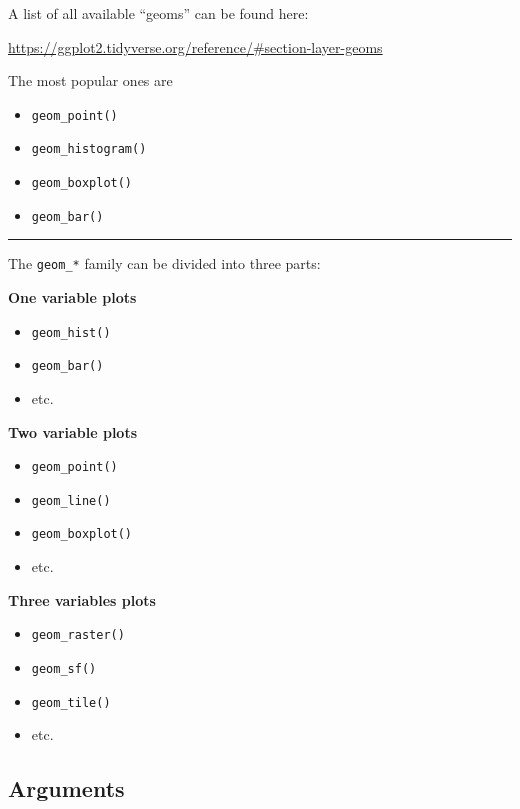 \documentclass[]{book}
\providecommand{\tightlist}{%
  \setlength{\itemsep}{0pt}\setlength{\parskip}{0pt}}
\begin{document}
A list of all available ``geoms'' can be found here:

\url{https://ggplot2.tidyverse.org/reference/\#section-layer-geoms}

The most popular ones are

\begin{itemize}
\item
  \texttt{geom\_point()}
\item
  \texttt{geom\_histogram()}
\item
  \texttt{geom\_boxplot()}
\item
  \texttt{geom\_bar()}
\end{itemize}

\begin{center}\rule{0.5\linewidth}{\linethickness}\end{center}

The \texttt{geom\_*} family can be divided into three parts:

\textbf{One variable plots}

\begin{itemize}
\tightlist
\item
  \texttt{geom\_hist()}
\item
  \texttt{geom\_bar()}
\item
  etc.
\end{itemize}

\textbf{Two variable plots}

\begin{itemize}
\tightlist
\item
  \texttt{geom\_point()}
\item
  \texttt{geom\_line()}
\item
  \texttt{geom\_boxplot()}
\item
  etc.
\end{itemize}

\textbf{Three variables plots}

\begin{itemize}
\tightlist
\item
  \texttt{geom\_raster()}
\item
  \texttt{geom\_sf()}
\item
  \texttt{geom\_tile()}
\item
  etc.
\end{itemize}

\hypertarget{arguments}{%
\subsection{Arguments}\label{arguments}}
\end{document}
